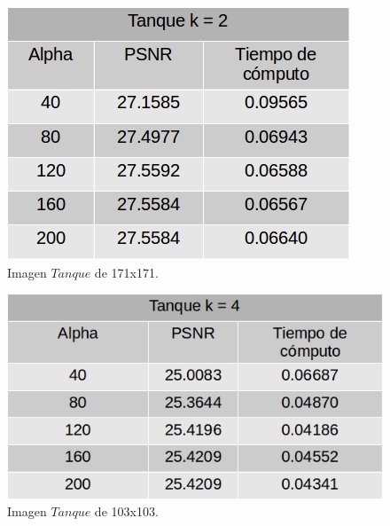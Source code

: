 \documentclass[a4paper]{article}
\begin{document}
\begin{figure}[H]
    \centering
    \includegraphics[scale=0.4]{imagenes/tanque2.jpg}
    \caption{Imagen $Tanque$ de 171x171.}
	\label{tanquee}
    \end{figure}
    
\begin{figure}[H]
    \centering
    \includegraphics[scale=0.4]{imagenes/tanque4.jpg}
    \caption{Imagen $Tanque$ de 103x103.}
	\label{tanquee}
    \end{figure}    
    
\end{document}
